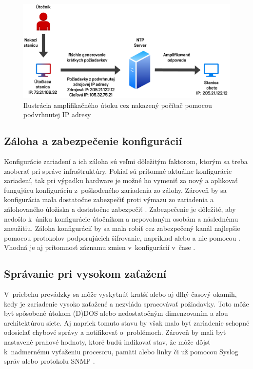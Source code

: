 \begin{figure}[H]
	\begin{center}
		\includegraphics[scale=0.75]{obrazky/ntp_amplification.pdf}
	\end{center}
	\caption[Ilustrácia amplifikačného útoku cez nakazený počítač pomocou podvrhnutej IP adresy]{Ilustrácia amplifikačného útoku cez nakazený počítač pomocou podvrhnutej IP adresy \cite{gTkmbyKon9H6tuAm}}
	\label{fig:ntp-amp}
\end{figure} 

\subsection*{Záloha a zabezpečenie konfigurácií}
Konfigurácie zariadení a ich záloha sú veľmi dôležitým faktorom, ktorým sa treba zaoberať pri správe infraštruktúry. Pokiaľ sú prítomné aktuálne konfigurácie zariadení, tak pri výpadku hardware je možné ho vymeniť za nový a aplikovať fungujúcu konfiguráciu z~poškodeného zariadenia zo zálohy. Zároveň by sa konfigurácia mala dostatočne zabezpečiť proti výmazu zo zariadenia a zálohovaného úložiska a dostatočne zabezpečiť \cite{McMillan2018}. Zabezpečenie je dôležité, aby nedošlo k~úniku konfigurácie útočníkom a nepovolaným osobám a následnému zneužitiu. Záloha konfigurácií by sa mala robiť cez zabezpečený kanál najlepšie pomocou protokolov podporujúcich šifrovanie, napríklad  alebo  a nie pomocou  \cite{Singh2018}. Vhodná je aj prítomnosť záznamu zmien v~konfigurácií v~čase \cite{McMillan2018}.

\subsection*{Správanie pri vysokom zaťažení}
V~priebehu prevádzky sa môže vyskytnúť kratší alebo aj dlhý časový okamih, kedy je zariadenie vysoko zaťažené a nezvláda spracovávať požiadavky. Toto môže byť spôsobené útokom (D)DOS alebo nedostatočným dimenzovaním a zlou architektúrou siete. Aj napriek tomuto stavu by však malo byť zariadenie schopné odosielať chybové správy a notifikovať o~problémoch. Zároveň by mali byť nastavené prahové hodnoty, ktoré budú indikovať stav, že môže dôjsť k~nadmernému vyťaženiu procesoru, pamäti alebo linky či už pomocou Syslog správ alebo protokolu SNMP \cite{uYLsMtQInofenpV3} \cite{Singh2018}.

